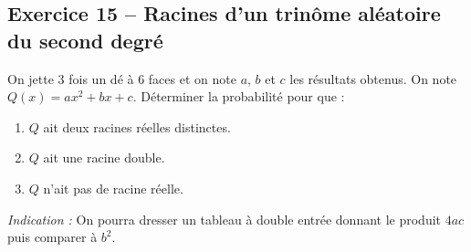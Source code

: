 \documentclass[11pt,a4paper]{article}
\begin{document}
\vspace{0.3cm}

\subsection*{Exercice 15 -- Racines d'un trinôme aléatoire du second degré}

On jette 3 fois un dé à 6 faces et on note $a$, $b$ et $c$ les résultats obtenus. On note $Q(x) = ax^2 + bx + c$.
Déterminer la probabilité pour que :
\begin{enumerate}[label=\arabic*.]
    \item $Q$ ait deux racines réelles distinctes.
    \item $Q$ ait une racine double.
    \item $Q$ n'ait pas de racine réelle.
\end{enumerate}
\emph{Indication :} On pourra dresser un tableau à double entrée donnant le produit $4ac$ puis comparer à $b^2$.
\end{document}
